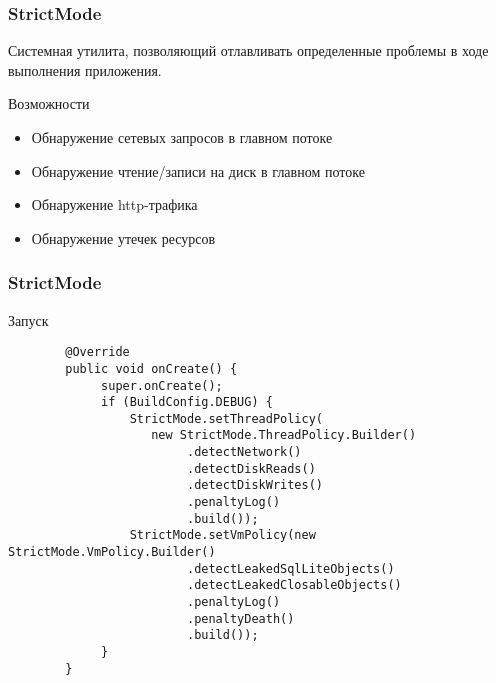 \documentclass{beamer}
\begin{document}
\begin{frame}
    \frametitle{StrictMode}
    Системная утилита, позволяющий отлавливать определенные проблемы в ходе
    выполнения приложения.
    \begin{block}{Возможности}
        \begin{itemize}
            \item{Обнаружение сетевых запросов в главном потоке}
            \item{Обнаружение чтение/записи на диск в главном потоке}
            \item{Обнаружение http-трафика}
            \item{Обнаружение утечек ресурсов}
        \end{itemize}
    \end{block}
\end{frame}
\begin{frame}[fragile]
    \frametitle{StrictMode}
    \begin{block}{Запуск}
        \begin{verbatim}
        @Override
        public void onCreate() {
             super.onCreate();
             if (BuildConfig.DEBUG) {
                 StrictMode.setThreadPolicy(
                    new StrictMode.ThreadPolicy.Builder()
                         .detectNetwork()
                         .detectDiskReads()
                         .detectDiskWrites()
                         .penaltyLog()
                         .build());
                 StrictMode.setVmPolicy(new StrictMode.VmPolicy.Builder()
                         .detectLeakedSqlLiteObjects()
                         .detectLeakedClosableObjects()
                         .penaltyLog()
                         .penaltyDeath()
                         .build());
             }
        }
        \end{verbatim}
    \end{block}
\end{frame}
\end{document}
